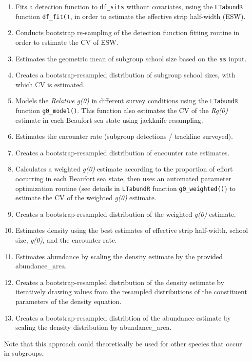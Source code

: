 \documentclass[
]{book}
\begin{document}
\begin{enumerate}
\def\labelenumi{\arabic{enumi}.}
\item
  Fits a detection function to \texttt{df\_sits} without covariates, using the \texttt{LTabundR} function \texttt{df\_fit()}, in order to estimate the effective strip half-width (ESW).
\item
  Conducts bootstrap re-sampling of the detection function fitting routine in order to estimate the CV of ESW.
\item
  Estimates the geometric mean of subgroup school size based on the \texttt{ss} input.
\item
  Creates a bootstrap-resampled distribution of subgroup school sizes, with which CV is estimated.
\item
  Models the \emph{Relative g(0)} in different survey conditions using the \texttt{LTabundR} function \texttt{g0\_model()}. This function also estimates the CV of the \emph{Rg(0)} estimate in each Beaufort sea state using jackknife resampling.
\item
  Estimates the encounter rate (subgroup detections / trackline surveyed).
\item
  Creates a bootstrap-resampled distribution of encounter rate estimates.
\item
  Calculates a weighted \emph{g(0)} estimate according to the proportion of effort occurring in each Beaufort sea state, then uses an automated parameter optimization routine (see details in \texttt{LTabundR} function \texttt{g0\_weighted()}) to estimate the CV of the weighted \emph{g(0)} estimate.
\item
  Creates a bootstrap-resampled distribution of the weighted \emph{g(0)} estimate.
\item
  Estimates density using the best estimates of effective strip half-width, school size, \emph{g(0)}, and the encounter rate.
\item
  Estimates abundance by scaling the density estimate by the provided abundance\_area.
\item
  Creates a bootstrap-resampled distribution of the density estimate by iteratively drawing values from the resampled distributions of the constituent parameters of the density equation.
\item
  Creates a bootstrap-resampled distribtion of the abundance estimate by scaling the density distribution by abundance\_area.
\end{enumerate}

Note that this approach could theoretically be used for other species that occur in subgroups.
\end{document}
